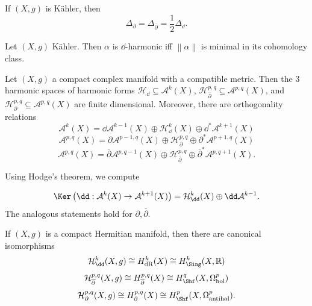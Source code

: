 
\begin{theorem}\label{thm:jsak}
	If $(X,g)$ is K\"ahler, then
	\[
		\Delta_{\partial } =\Delta _{\overline{\partial } } =\frac{1}{2} \Delta _{\dd } 
	.\]
\end{theorem}
\begin{proposition}\label{prp:lkasn}
	Let $(X,g)$ K\"ahler. Then $\alpha $ is $\dd $-harmonic iff $\left\| \alpha  \right\| $ is minimal in its cohomology class.
\end{proposition}

\begin{theorem}[Hodge]\label{thm:Hodge}
	Let $(X,g)$ a compact complex manifold with a compatible metric. Then the 3 harmonic spaces of harmonic forms $\mathcal{H}_{\dd} \subseteq \mathcal{A} ^{k} (X)$, $\mathcal{H} ^{p,q}_{\overline{\partial } } \subseteq \mathcal{A} ^{p,q} (X)$, and $\mathcal{H}_{\partial }^{p,q} \subseteq \mathcal{A} ^{p,q} (X)$ are finite dimensional. Moreover, there are orthogonality relations
	\[
		\mathcal{A} ^{k} (X) = \dd \mathcal{A} ^{k-1} (X)\oplus \mathcal{H} ^k_{\dd } (X) \oplus \dd ^*\mathcal{A} ^{k+1} (X)
	\]
	\[
		\mathcal{A} ^{p,q}(X) = \partial \mathcal{A} ^{p-1,q} (X) \oplus \mathcal{H} ^{p,q} _{\partial } \oplus \partial ^* \mathcal{A} ^{p+1,q} (X)
	\]
	\[
		\mathcal{A} ^{p,q} (X) = \overline{\partial } \mathcal{A} ^{p,q-1} (X)\oplus \mathcal{H} ^{p,q}_{\overline{\partial } } \oplus \overline{\partial }^* \mathcal{A} ^{p,q+1} (X)
	.\]
\end{theorem}

Using Hodge's theorem, we compute

\begin{lemma}\label{lma:Kjnas}
	\[
		\Ker \left( \dd : \mathcal{A} ^k(X) \to \mathcal{A} ^{k+1} (X) \right) =\mathcal{H} _{\dd } ^k(X) \oplus \dd \mathcal{A} ^{k-1} 
	.\]
	The analogous statements hold for $\partial ,\overline{\partial } $.
\end{lemma}

\begin{corollary}\label{cor:klas}
	If $(X,g)$ is a compact Hermitian manifold, then there are canonical isomorphisms
	\[
		\mathcal{H} ^k_{\dd } (X,g) \cong H^k_{\mathrm{dR} } (X) \cong H^k_{\Sing } (X,\mathbb{R} )
	\]
	\[
		\mathcal{H} ^{p,q}_{\overline{\partial } } (X,g) \cong H^{p,q}_{\overline{\partial } } (X) \cong H^q_{\Shf } (X,\Omega ^p_{\mathrm{hol} } )
	\]
	\[
		\mathcal{H} ^{p,q} _{\partial } (X,g)\cong H^{p,q} _{\partial } (X) \cong H^p_{\Shf } (X,\Omega ^p_{\mathrm{antihol} } )
	.\]
\end{corollary}

